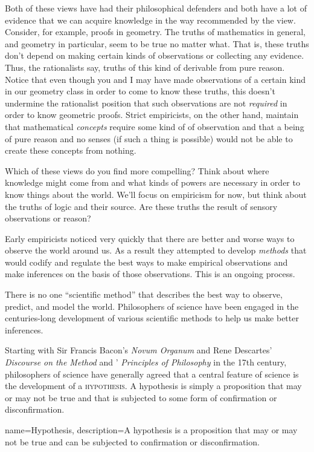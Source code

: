 Both of these views have had their philosophical defenders and both have a lot of evidence that we can acquire knowledge in the way recommended by the view. Consider, for example, proofs in geometry. The truths of mathematics in general, and geometry in particular, seem to be true no matter what. That is, these truths don't depend on making certain kinds of observations or collecting any evidence. Thus, the rationalists say, truths of this kind of derivable from pure reason. Notice that even though you and I may have made observations of a certain kind in our geometry class in order to come to know these truths, this doesn't undermine the rationalist position that such observations are not \emph{required} in order to know geometric proofs. Strict empiricists, on the other hand, maintain that mathematical \emph{concepts} require some kind of of observation and that a being of pure reason and no senses (if such a thing is possible) would not be able to create these concepts from nothing.

Which of these views do you find more compelling? Think about where knowledge might come from and what kinds of powers are necessary in order to know things about the world. We'll focus on empiricism for now, but think about the truths of logic and their source. Are these truths the result of sensory observations or reason?

Early empiricists noticed very quickly that there are better and worse ways to observe the world around us. As a result they attempted to develop \emph{methods} that would codify and regulate the best ways to make empirical observations and make inferences on the basis of those observations. This is an ongoing process.

There is no one ``scientific method'' that describes the best way to observe, predict, and model the world. Philosophers of science have been engaged in the centuries-long development of various scientific methods to help us make better inferences.

Starting with Sir Francis Bacon's \textit{Novum Organum} and Rene Descartes' \textit{Discourse on the Method} and ' \textit{Principles of Philosophy} in the 17th century, philosophers of science have generally agreed that a central feature of science is the development of a \textsc{\gls{hypothesis}}. A hypothesis is simply a proposition that may or may not be true and that is subjected to some form of confirmation or disconfirmation.


{
name=Hypothesis,
description={A hypothesis is a proposition that may or may not be true and can be subjected to confirmation or disconfirmation.}
}


